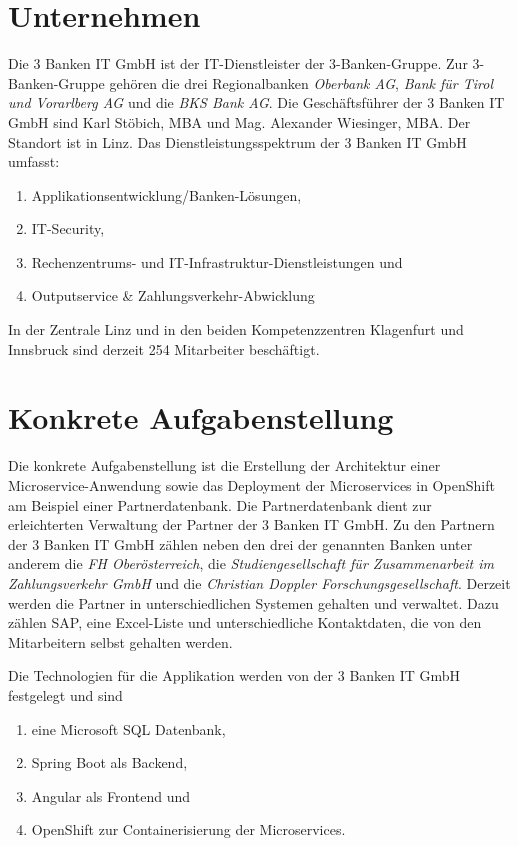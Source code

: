 \documentclass[master,german]{hgbthesis}
\begin{document}
\section{Unternehmen}
Die 3 Banken IT GmbH ist der IT-Dienstleister der 3-Banken-Gruppe. Zur 3-Banken-Gruppe gehören die drei Regionalbanken \textit{Oberbank AG}, \textit{Bank für Tirol und Vorarlberg AG} und die \textit{BKS Bank AG}.
Die Geschäftsführer der 3 Banken IT GmbH sind Karl Stöbich, MBA und Mag. Alexander Wiesinger, MBA. Der Standort ist in Linz.
Das Dienstleistungsspektrum der 3 Banken IT GmbH umfasst:
\begin{enumerate}
	\item Applikationsentwicklung/Banken-Lösungen,
	\item IT-Security,
	\item Rechenzentrums- und IT-Infrastruktur-Dienstleistungen und
	\item Outputservice \& Zahlungsverkehr-Abwicklung
\end{enumerate} 

In der Zentrale Linz und in den beiden Kompetenzzentren Klagenfurt und Innsbruck sind derzeit 254 Mitarbeiter beschäftigt.
\cite{3BankenIT}

\section{Konkrete Aufgabenstellung}
Die konkrete Aufgabenstellung ist die Erstellung der Architektur einer Microservice-Anwendung sowie das Deployment der Microservices in OpenShift am Beispiel einer Partnerdatenbank. Die Partnerdatenbank dient zur erleichterten Verwaltung der Partner der 3 Banken IT GmbH. Zu den Partnern der 3 Banken IT GmbH zählen neben den drei der genannten Banken unter anderem die \textit{FH Oberösterreich}, die \textit{Studiengesellschaft für Zusammenarbeit im Zahlungsverkehr GmbH} und die \textit{Christian Doppler Forschungsgesellschaft}.
Derzeit werden die Partner in unterschiedlichen Systemen gehalten und verwaltet. Dazu zählen SAP, eine Excel-Liste und unterschiedliche Kontaktdaten, die von den Mitarbeitern selbst gehalten werden.

Die Technologien für die Applikation werden von der 3 Banken IT GmbH festgelegt und sind
\begin{enumerate}
	\item eine Microsoft SQL Datenbank,
	\item Spring Boot als Backend,
	\item Angular als Frontend und
	\item OpenShift zur Containerisierung der Microservices.
\end{enumerate}
\end{document}
